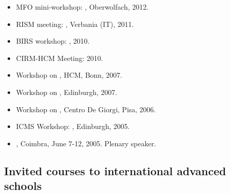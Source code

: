 \documentclass[reqno,11pt]{article}
\theoremstyle{plain}
\begin{document}
\begin{itemize}[topsep=-0.5\parsep,itemsep=-4pt,leftmargin=*]
\item MFO mini-workshop: \href{https://publications.mfo.de/handle/mfo/3273}{},
Oberwolfach, 2012.

\item RISM meeting: \href{https://www.mate.polimi.it/workshop/RISM3/index.php?tab=home}{}, 
 Verbania (IT), 2011.

 \item BIRS workshop: \href{http://www.birs.ca/events/2010/5-day-workshops/10w5054}{}, %
   2010.

 \item CIRM-HCM Meeting:
 2010.

\item Workshop on \href{https://www.him.uni-bonn.de/programs/past-programs/past-trimester-programs/complex-stochastic-systems-discrete-vs-continuous/workshop-3-particle-systems-nonlinear-diffusions-and-equilibration/}{},
 HCM, Bonn, 2007.

 \item Workshop on 
 ,
 Edinburgh, 2007.

\item Workshop on , Centro De Giorgi, Pisa, 2006.



 \item ICMS Workshop: ,
 Edinburgh, 2005.

 \item {},
 Coimbra, June 7-12, 2005. Plenary speaker.
\end{itemize}

\subsection*{Invited courses to international advanced schools}
\end{document}
